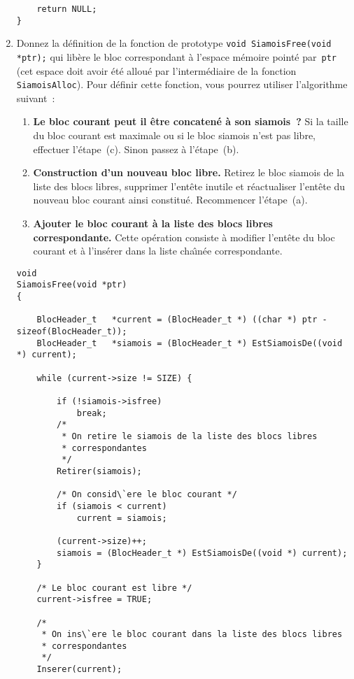 \begin{enumerate}
\begin{correction}
\begin{verbatim}
	return NULL;
}
\end{verbatim}
\end{correction}
\fi
\item Donnez la d\'efinition de la fonction de prototype %
  \verb+void SiamoisFree(void *ptr);+ qui lib\`ere le bloc
  correspondant \`a l'espace m\'emoire point\'e par~\verb+ptr+ (cet
  espace doit avoir \'et\'e allou\'e par l'interm\'ediaire de la
  fonction \verb+SiamoisAlloc+). Pour d\'efinir cette fonction,
  vous pourrez utiliser l'algorithme suivant~:
  \begin{enumerate}
  \item \textbf{Le bloc courant peut il \^etre concaten\'e \`a son
      siamois~?}  Si la taille du bloc courant est maximale ou si le
    bloc siamois n'est pas libre, effectuer l'\'etape~(c). Sinon passez \`a l'\'etape~(b).
  \item \textbf{Construction d'un nouveau bloc libre.} Retirez le bloc
    siamois de la liste des blocs libres, supprimer l'ent\^ete inutile
    et r\'eactualiser l'ent\^ete du nouveau bloc courant ainsi
    constitu\'e. Recommencer l'\'etape~(a).
  \item \textbf{Ajouter le bloc courant \`a la liste des blocs libres
      correspondante.} Cette op\'eration consiste \`a modifier
    l'ent\^ete du bloc courant et \`a l'ins\'erer dans la liste
    cha\^\i{}n\'ee correspondante.
  \end{enumerate}
\ifcorrection
\begin{correction}
\newpage
\begin{verbatim}
void
SiamoisFree(void *ptr)
{

	BlocHeader_t   *current = (BlocHeader_t *) ((char *) ptr - sizeof(BlocHeader_t));
	BlocHeader_t   *siamois = (BlocHeader_t *) EstSiamoisDe((void *) current);

	while (current->size != SIZE) {

		if (!siamois->isfree)
			break;
		/*
		 * On retire le siamois de la liste des blocs libres
		 * correspondantes
		 */
		Retirer(siamois);

		/* On consid\`ere le bloc courant */
		if (siamois < current)
			current = siamois;

		(current->size)++;
		siamois = (BlocHeader_t *) EstSiamoisDe((void *) current);
	}

	/* Le bloc courant est libre */
	current->isfree = TRUE;

	/*
	 * On ins\`ere le bloc courant dans la liste des blocs libres
	 * correspondantes
	 */
	Inserer(current);


\end{verbatim}
\end{correction}
\end{enumerate}
